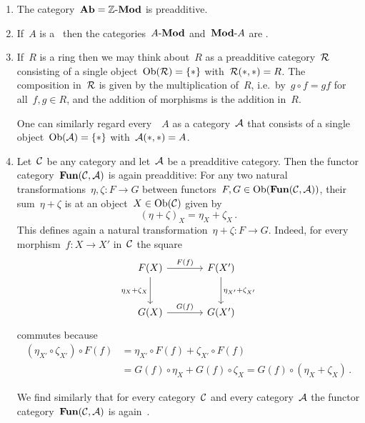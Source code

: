 \begin{example}
  \leavevmode
  \begin{enumerate}
    \item
      The category~$\mathbf{Ab} = \text{$\mathbb{Z}$-$\mathbf{Mod}$}$ is preadditive.
    \item
      If~$A$ is a~{\kalg} then the categories~$\text{$A$-$\mathbf{Mod}$}$ and~$\text{$\mathbf{Mod}$-$A$}$ are {\preklin}.
    \item
      If~$R$ is a ring then we may think about~$R$ as a preadditive category~$\mathcal{R}$ consisting of a single object~$\operatorname{Ob}(\mathcal{R}) = \{ \ast \}$ with~$\mathcal{R}(\ast,\ast) = R$.
      The composition in~$\mathcal{R}$ is given by the multiplication of~$R$, i.e.\ by~$g \circ f = gf$ for all~$f, g \in R$, and the addition of morphisms is the addition in~$R$.
      
      One can similarly regard every~{\kalg}~$A$ as a {\preklin} category~$\mathcal{A}$ that consists of a single object~$\operatorname{Ob}(\mathcal{A}) = \{\ast\}$ with~$\mathcal{A}(\ast,\ast) = A$.
    \item
      Let~$\mathcal{C}$ be any category and let~$\mathcal{A}$ be a preadditive category.
      Then the functor category~$\mathbf{Fun}(\mathcal{C}, \mathcal{A})$ is again preadditive:
      For any two natural transformations~$\eta, \zeta \colon F \to G$ between functors~$F, G \in \operatorname{Ob}(\mathbf{Fun}(\mathcal{C}, \mathcal{A}))$, their sum~$\eta + \zeta$ is at an object~$X \in \operatorname{Ob}(\mathcal{C})$ given by
      \[
          (\eta + \zeta)_X
        = \eta_X + \zeta_X \,.
      \]
      This defines again a natural transformation~$\eta + \zeta \colon F \to G$.
      Indeed, for every morphism~$f \colon X \to X'$ in~$\mathcal{C}$ the square
      \[
        \begin{tikzcd}[sep = large]
            F(X)
            \arrow{r}[above]{F(f)}
            \arrow{d}[left]{\eta_X + \zeta_X}
          & F(X')
            \arrow{d}[right]{\eta_{X'} + \zeta_{X'}}
          \\
            G(X)
            \arrow{r}[above]{G(f)}
          & G(X')
        \end{tikzcd}
      \]
      commutes because
      \begin{align*}
            (\eta_{X'} \circ \zeta_{X'}) \circ F(f)
        &=  \eta_{X'} \circ F(f) + \zeta_{X'} \circ F(f)  \\
        &=  G(f) \circ \eta_X + G(f) \circ \zeta_X
         =  G(f) \circ (\eta_X + \zeta_X) \,.
      \end{align*}
      
      We find similarly that for every category~$\mathcal{C}$ and every {\preklin} category~$\mathcal{A}$ the functor category~$\mathbf{Fun}(\mathcal{C}, \mathcal{A})$ is again~{\preklin}. 
  \end{enumerate}
\end{example}


